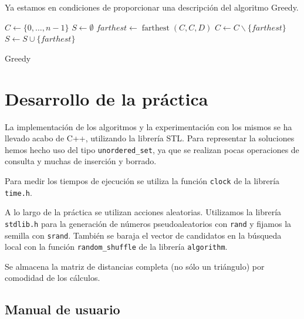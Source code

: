 \documentclass{article}
\begin{document}
Ya estamos en condiciones de proporcionar una descripción del algoritmo Greedy.

 \begin{algorithm}[H]
	\DontPrintSemicolon %
	$C \gets \{0,\ldots, n-1\}$ 
	$S \gets \emptyset$ 
	$farthest \gets \operatorname{farthest}(C,C,D)$ 
	$C \gets C\backslash \{farthest\}$\;
	$S \gets S\cup \{farthest\}$\;
	\;
	\;
	\caption{{\sc Greedy}}
	\label{alg:greedy}
\end{algorithm}

\pagebreak

\section{Desarrollo de la práctica}

La implementación de los algoritmos y la experimentación con los mismos se ha llevado acabo de C++, utilizando la librería STL. 
Para representar la soluciones hemos hecho uso del tipo \texttt{unordered\_set}, ya que se realizan pocas operaciones de consulta y
muchas de inserción y borrado.

Para medir los tiempos de ejecución se utiliza la función \texttt{clock} de la librería \texttt{time.h}.

A lo largo de la práctica se utilizan acciones aleatorias. Utilizamos la librería \texttt{stdlib.h} para la generación de
números pseudoaleatorios con \texttt{rand} y fijamos la semilla con \texttt{srand}. También se baraja el vector de candidatos
en la búsqueda local con la función \texttt{random\_shuffle} de la librería \texttt{algorithm}.

Se almacena la matriz de distancias completa (no sólo un triángulo) por comodidad de los cálculos.

\subsection{Manual de usuario}
\end{document}
